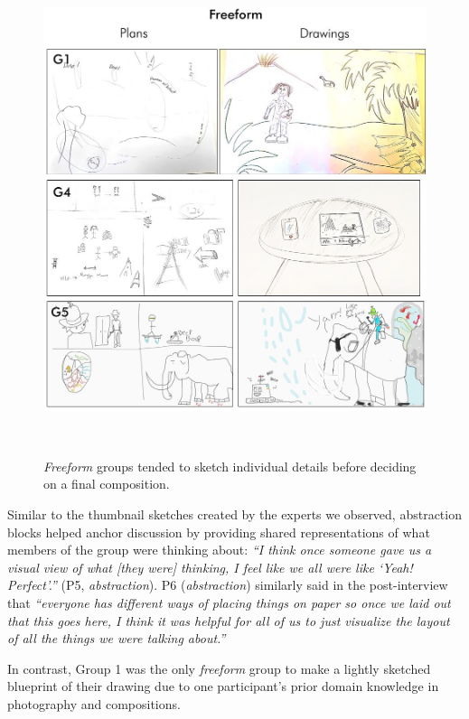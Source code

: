 \begin{figure}
\centering
  \vspace{-0.2in}
\includegraphics[width=\textwidth]{abstraction/figures/freeform.jpg}
\vspace{-0.3in}
  \caption{\textit{Freeform} groups tended to sketch individual details before deciding on a final composition.}
  ~\label{fig:freeform_drawings}
  \vspace{-0.2in}
\end{figure}

Similar to the thumbnail sketches created by the experts we observed, abstraction blocks helped anchor discussion by providing shared representations of what members of the group were thinking about: \textit{``I think once someone gave us a visual view of what [they were] thinking, I feel like we all were like ‘Yeah! Perfect'.''} (P5, \textit{abstraction}). P6 (\textit{abstraction}) similarly said in the post-interview that \textit{``everyone has different ways of placing things on paper so once we laid out that this goes here, I think it was helpful for all of us to just visualize the layout of all the things we were talking about.''}

In contrast, Group 1 was the only \textit{freeform} group to make a lightly sketched blueprint of their drawing due to one participant's prior domain knowledge in photography and compositions. 

